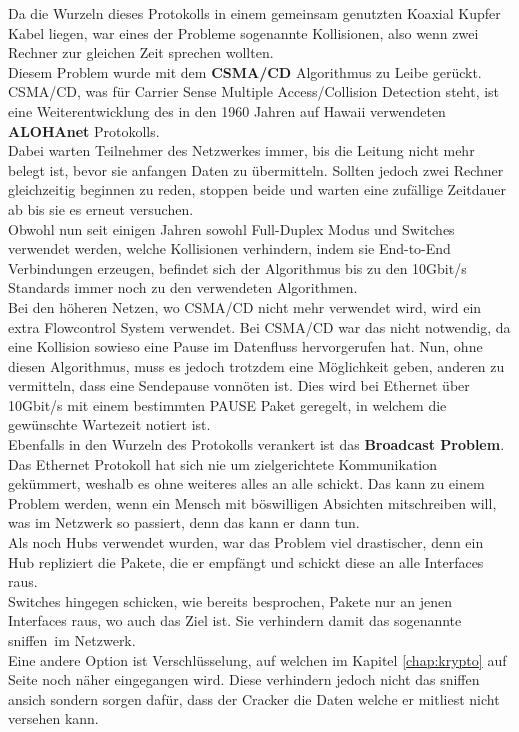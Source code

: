 \documentclass[12pt,a4paper]{report}
\begin{document}
Da die Wurzeln dieses Protokolls in einem gemeinsam genutzten Koaxial Kupfer Kabel liegen, war eines der Probleme sogenannte Kollisionen, also wenn zwei Rechner zur gleichen Zeit sprechen wollten.\\
Diesem Problem wurde mit dem \textbf{CSMA/CD} Algorithmus zu Leibe gerückt. CSMA/CD, was für Carrier Sense Multiple Access/Collision Detection steht, ist eine Weiterentwicklung des in den 1960 Jahren auf Hawaii verwendeten \textbf{ALOHAnet} Protokolls.\\
Dabei warten Teilnehmer des Netzwerkes immer, bis die Leitung nicht mehr belegt ist, bevor sie anfangen Daten zu übermitteln. Sollten jedoch zwei Rechner gleichzeitig beginnen zu reden, stoppen beide und warten eine zufällige Zeitdauer ab bis sie es erneut versuchen.\\
Obwohl nun seit einigen Jahren sowohl Full-Duplex Modus und Switches verwendet werden, welche Kollisionen verhindern, indem sie End-to-End Verbindungen erzeugen, befindet sich der Algorithmus bis zu den 10Gbit/s Standards immer noch zu den verwendeten Algorithmen.\\
Bei den höheren Netzen, wo CSMA/CD nicht mehr verwendet wird, wird ein extra Flowcontrol System verwendet. Bei CSMA/CD war das nicht notwendig, da eine Kollision sowieso eine Pause im Datenfluss hervorgerufen hat. Nun, ohne diesen Algorithmus, muss es jedoch trotzdem eine Möglichkeit geben, anderen zu vermitteln, dass eine Sendepause vonnöten ist. Dies wird bei Ethernet über 10Gbit/s mit einem bestimmten PAUSE Paket geregelt, in welchem die gewünschte Wartezeit notiert ist.\\

Ebenfalls in den Wurzeln des Protokolls verankert ist das \textbf{Broadcast Problem}.\\
Das Ethernet Protokoll hat sich nie um zielgerichtete Kommunikation gekümmert, weshalb es ohne weiteres alles an alle schickt. Das kann zu einem Problem werden, wenn ein Mensch mit böswilligen Absichten mitschreiben will, was im Netzwerk so passiert, denn das kann er dann tun.\\
Als noch Hubs verwendet wurden, war das Problem viel drastischer, denn ein Hub repliziert die Pakete, die er empfängt und schickt diese an alle Interfaces raus.\\
Switches hingegen schicken, wie bereits besprochen, Pakete nur an jenen Interfaces raus, wo auch das Ziel ist. Sie verhindern damit das sogenannte \glqq sniffen\grqq \ im Netzwerk.\\
Eine andere Option ist Verschlüsselung, auf welchen im Kapitel \ref{chap:krypto} auf Seite \pageref{chap:krypto} noch näher eingegangen wird. Diese verhindern jedoch nicht das sniffen ansich sondern sorgen dafür, dass der Cracker die Daten welche er mitliest nicht versehen kann.\\
\end{document}
